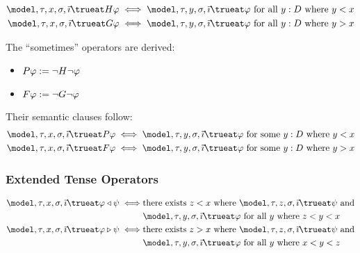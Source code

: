 \documentclass[../LogosReference.tex]{subfiles}
\begin{document}
\begin{definition}\label{def:tense-truth}
\begin{align}
    \model, \tau, x, \assignment, \tempindex \trueat \allpast\metaA     & \iff \model, \tau, y, \assignment, \tempindex \trueat \metaA \text{ for all } y : D \text{ where } y < x  \\
    \model, \tau, x, \assignment, \tempindex \trueat \allfuture\metaA & \iff \model, \tau, y, \assignment, \tempindex \trueat \metaA \text{ for all } y : D \text{ where } y > x
\end{align}
\end{definition}

\begin{remark}\label{rem:tense-derived}
The ``sometimes'' operators are derived:
\begin{itemize}
    \item $P\varphi := \neg H\neg\varphi$
    \item $F\varphi := \neg G\neg\varphi$
\end{itemize}
Their semantic clauses follow:
\begin{align}
    \model, \tau, x, \assignment, \tempindex \trueat \somepast\metaA    & \iff \model, \tau, y, \assignment, \tempindex \trueat \metaA \text{ for some } y : D \text{ where } y < x \\
    \model, \tau, x, \assignment, \tempindex \trueat \somefuture\metaA & \iff \model, \tau, y, \assignment, \tempindex \trueat \metaA \text{ for some } y : D \text{ where } y > x
\end{align}
\end{remark}

\subsubsection{Extended Tense Operators}

\begin{definition}\label{def:since-until-truth}
	\begin{align}
		\model, \tau, x, \assignment, \tempindex \trueat \metaA \since \metaB \iff 
      & \text{there exists } z < x \text{ where } \model, \tau, z, \assignment, \tempindex \trueat \metaB \text{ and} \notag \\
	    & \model, \tau, y, \assignment, \tempindex \trueat \metaA \text{ for all } y \text{ where } z < y < x \\
		\model, \tau, x, \assignment, \tempindex \trueat \metaA \until \metaB \iff 
      & \text{there exists } z > x \text{ where } \model, \tau, z, \assignment, \tempindex \trueat \metaB \text{ and}\notag \\
		  & \model, \tau, y, \assignment, \tempindex \trueat \metaA \text{ for all } y \text{ where } x < y < z
	\end{align}
\end{definition}
\end{document}
